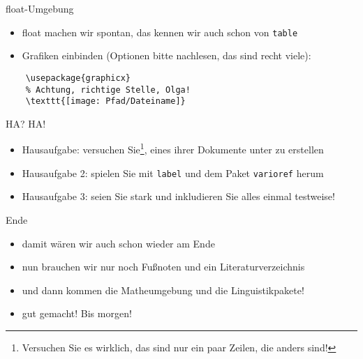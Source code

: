 \begin{frame}[fragile]{float-Umgebung}
    \begin{itemize}[<+->]
        \item float machen wir spontan, das kennen wir auch schon von \texttt{table}
        \item Grafiken einbinden (Optionen bitte nachlesen, das sind recht viele):
    \end{itemize}
    \begin{lstlisting}
    \usepackage{graphicx}
    % Achtung, richtige Stelle, Olga!
    \texttt{[image: Pfad/Dateiname]}
    \end{lstlisting}
\end{frame}

\begin{frame}[fragile]{HA? HA!}
    \begin{itemize}[<+->]
    \item Hausaufgabe: versuchen Sie\footnote{Versuchen Sie es wirklich, das sind nur ein paar Zeilen, die anders sind!}, eines ihrer Dokumente unter \XeTeX zu erstellen
    \item Hausaufgabe 2: spielen Sie mit \lstinline|label| und dem Paket \lstinline|varioref| herum
    \item Hausaufgabe 3: seien Sie stark und inkludieren Sie alles einmal testweise!
    \end{itemize}
\end{frame}

\begin{frame}[fragile]{Ende}
    \begin{itemize}[<+->]
    \item damit wären wir auch schon wieder am Ende
    \item nun brauchen wir nur noch Fußnoten und ein Literaturverzeichnis
    \item und dann kommen die Matheumgebung und die Linguistikpakete!
    \item gut gemacht! Bis morgen!
    \end{itemize}
\end{frame}
